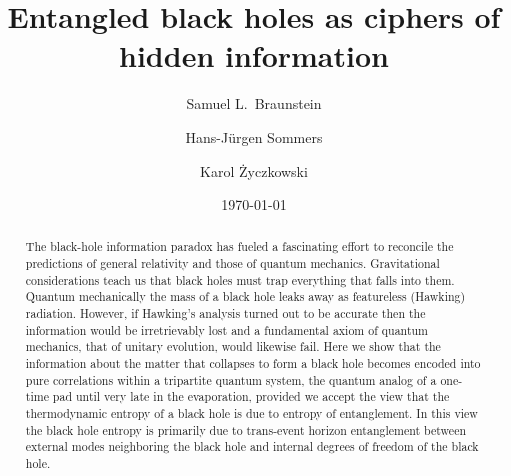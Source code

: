 \documentclass[twocolumn,aps,prl,amsmath,amssymb,floatfix]{revtex4}
\begin{document}
\title{Entangled black holes as ciphers of hidden information}

\author{Samuel L.\ Braunstein}
\author{Hans-J\"urgen Sommers}
\author{Karol \.{Z}yczkowski}

\date{\today}

\begin{abstract}
The black-hole information paradox has fueled a fascinating effort to
reconcile the predictions of general relativity and those of quantum
mechanics. Gravitational considerations teach us that black holes must
trap everything that falls into them. Quantum mechanically the mass of
a black hole leaks away as featureless (Hawking) radiation.
However, if Hawking's analysis turned out to be accurate then the
information would be irretrievably lost and a fundamental axiom of
quantum mechanics, that of unitary evolution, would likewise
fail. Here we show that the information about the
matter that collapses to form a black hole becomes encoded into pure
correlations within a tripartite quantum system, the quantum analog
of a one-time pad until very late in the evaporation,
provided we accept the view that the thermodynamic entropy of a black
hole is due to entropy of entanglement.
In this view the black hole entropy is primarily due to trans-event
horizon entanglement between external modes neighboring the black hole
and internal degrees of freedom of the black hole.
\end{abstract}

\maketitle
\end{document}
